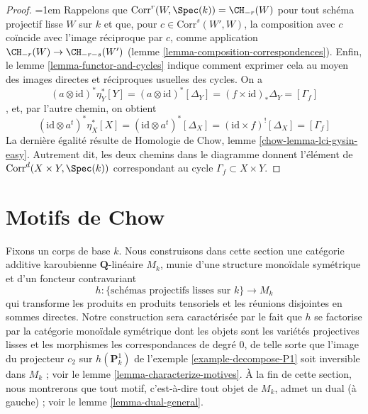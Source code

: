 \begin{proof}
{\emergencystretch=1em Rappelons que $\text{Corr}^r(W, \Spec(k)) = \CH_{-r}(W)$ pour tout
schéma projectif lisse $W$ sur $k$
et que, pour $c \in \text{Corr}^s(W', W)$, la composition
avec $c$ coïncide avec l'image réciproque par $c$, comme application
$\CH_{-r}(W) \to \CH_{-r - s}(W')$
(lemme \ref{lemma-composition-correspondences}).
Enfin, le lemme \ref{lemma-functor-and-cycles}
indique comment exprimer cela au moyen des images directes
et réciproques usuelles des cycles.
On a
$$
(a \otimes \text{id})^* \eta_Y^* [Y] =
(a \otimes \text{id})^* [\Delta_Y] =
(f \times \text{id})_*\Delta_Y = [\Gamma_f]
$$,
et, par l'autre chemin, on obtient
$$
(\text{id} \otimes a^t)^* \eta_X^* [X] =
(\text{id} \otimes a^t)^* [\Delta_X] =
(\text{id} \times f)^![\Delta_X] = [\Gamma_f]
$$
La dernière égalité résulte de
Homologie de Chow, lemme \ref{chow-lemma-lci-gysin-easy}.
Autrement dit, les deux chemins dans le diagramme donnent
l'élément de $\text{Corr}^d(X \times Y, \Spec(k))$
correspondant au cycle $\Gamma_f \subset X \times Y$.\par}
\end{proof}







\section{Motifs de Chow}
\label{section-chow-motives}

\noindent
Fixons un corps de base $k$. Nous construisons dans cette section une catégorie
additive karoubienne $\mathbf{Q}$-linéaire $M_k$, munie
d'une structure monoïdale symétrique et d'un foncteur contravariant
$$
h : \{\text{schémas projectifs lisses sur }k\} \longrightarrow M_k
$$
qui transforme les produits en produits tensoriels et les réunions disjointes en sommes directes.
Notre construction sera caractérisée par le fait que $h$ se factorise par
la catégorie monoïdale symétrique dont les objets sont les variétés projectives lisses
et les morphismes les correspondances de degré $0$, de telle sorte que
l'image du projecteur $c_2$ sur $h(\mathbf{P}^1_k)$ de
l'exemple \ref{example-decompose-P1} soit inversible dans $M_k$ ; voir
le lemme \ref{lemma-characterize-motives}.
À la fin de cette section, nous montrerons que tout motif, c'est-à-dire
tout objet de $M_k$, admet un dual (à gauche) ; voir le lemme \ref{lemma-dual-general}.

